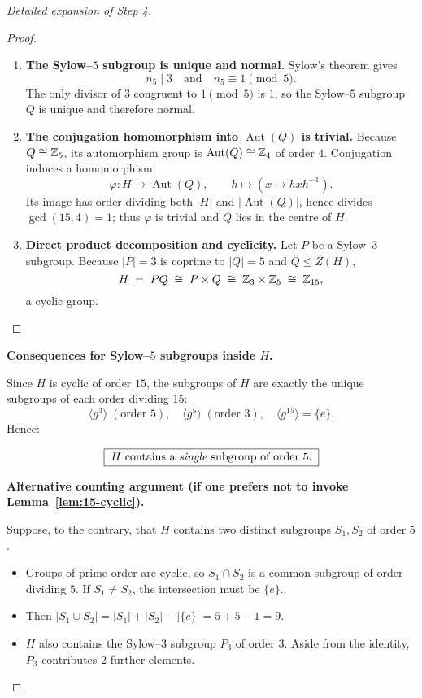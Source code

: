 \documentclass[12pt]{article}
\DeclareMathOperator{\Aut}{Aut}
\theoremstyle{definition} %
\theoremstyle{plain} %
\begin{document}
\begin{proof}[Detailed expansion of Step 4]
\begin{enumerate}
\begin{proof}
  \begin{enumerate}
  \item \textbf{The Sylow--$5$ subgroup is unique and normal.}
        Sylow’s theorem gives
        \[
            n_{5}\mid 3
            \quad\text{and}\quad
            n_{5}\equiv 1 \pmod{5}.
        \]
        The only divisor of $3$ congruent to $1 \pmod{5}$ is $1$,
        so the Sylow--$5$ subgroup $Q$ is unique and therefore normal.
  
  \item \textbf{The conjugation homomorphism into $\Aut(Q)$ is trivial.}
        Because $Q\cong\Bbb Z_{5}$, its automorphism group is
        $\Aut(Q)\cong\Bbb Z_{4}$ of order $4$.
        Conjugation induces a homomorphism
        \[
            \varphi:H \longrightarrow \Aut(Q),
            \qquad
            h\mapsto (x\mapsto hxh^{-1}).
        \]
        Its image has order dividing both $|H|$ and $|\Aut(Q)|$, hence
        divides $\gcd(15,4)=1$; thus $\varphi$ is trivial and $Q$
        lies in the centre of $H$.
  
  \item \textbf{Direct product decomposition and cyclicity.}
        Let $P$ be a Sylow--$3$ subgroup.  Because $|P|=3$ is coprime to
        $|Q|=5$ and $Q\le Z(H)$,
        \[
            H \;=\; P Q
            \;\cong\; P\times Q
            \;\cong\; \Bbb Z_{3}\times\Bbb Z_{5}
            \;\cong\; \Bbb Z_{15},
        \]
        a cyclic group.
  \end{enumerate}
  \end{proof}
  
  \medskip
  \noindent
  \textbf{Consequences for Sylow--$5$ subgroups inside $H$.}
  
  Since $H$ is cyclic of order $15$, the subgroups of $H$ are exactly
  the unique subgroups of each order dividing $15$:
  \[
      \langle g^{3}\rangle \;(\text{order }5), 
      \quad
      \langle g^{5}\rangle \;(\text{order }3),
      \quad
      \langle g^{15}\rangle = \{e\}.
  \]
  Hence:
  
  \[
  \boxed{\;H\text{ contains a \emph{single} subgroup of order }5.\;}
  \]
  
  \bigskip
  \noindent
  \textbf{Alternative counting argument (if one prefers not to invoke Lemma~\ref{lem:15-cyclic}).}
  
  Suppose, to the contrary, that $H$ contains two distinct subgroups
  $S_{1},S_{2}$ of order $5$.
  
  \begin{itemize}
  \item Groups of prime order are cyclic, so
        $S_{1}\cap S_{2}$ is a common subgroup of order dividing $5$.
        If $S_{1}\neq S_{2}$, the intersection must be $\{e\}$.
  \item Then $|S_{1}\cup S_{2}| = |S_{1}|+|S_{2}|-|\{e\}| = 5+5-1 = 9$.
  \item $H$ also contains the Sylow--$3$ subgroup $P_{3}$ of order $3$.
        Aside from the identity, $P_{3}$ contributes $2$ further elements.
  \end{itemize}
  

\end{enumerate}
\end{proof}
\end{document}
